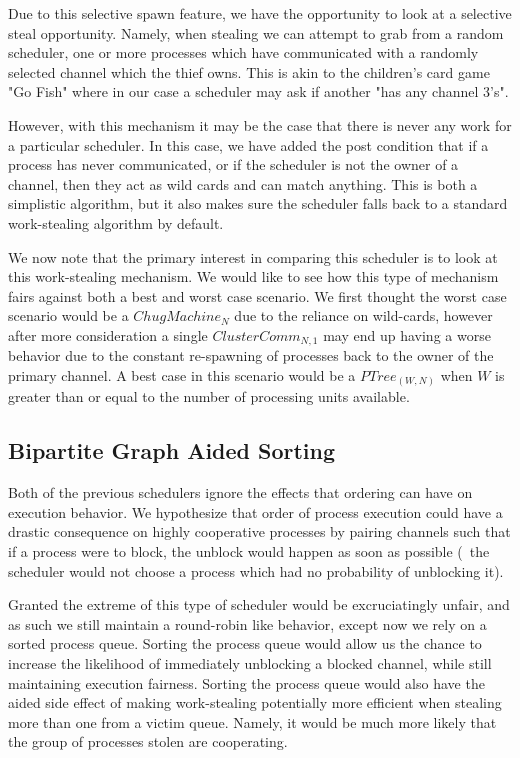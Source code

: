 Due to this selective spawn feature, we have the opportunity to look at a 
selective steal opportunity. Namely, when stealing we can attempt to grab from
a random scheduler, one or more processes which have communicated with a 
randomly selected channel which the thief owns. This is akin to the children's
card game "Go Fish" where in our case a scheduler may ask if another "has any
channel 3's".

However, with this mechanism it may be the case that there is never any work
for a particular scheduler. In this case, we have added the post condition that
if a process has never communicated, or if the scheduler is not the owner of a
channel, then they act as wild cards and can match anything. This is both a 
simplistic algorithm, but it also makes sure the scheduler falls back to a 
standard work-stealing algorithm by default.

We now note that the primary interest in comparing this scheduler is to look at 
this work-stealing mechanism.
We would like to see how this type of mechanism fairs against both a best and
worst case scenario. We first thought the worst case scenario would be a 
$ChugMachine_N$ due to the reliance on wild-cards, however after more 
consideration a single $ClusterComm_{N,1}$ may end up having a worse behavior
due to the constant re-spawning of processes back to the owner of the primary
channel. A best case in this scenario would be a $PTree_{(W,N)}$ when $W$ is greater than or equal
to the number of processing units available.

\subsection{Bipartite Graph Aided Sorting}
    \label{sec:bipartite graph aided sorting}

Both of the previous schedulers ignore the effects that ordering can have on
execution behavior. We hypothesize that order of process execution could have
a drastic consequence on highly cooperative processes by pairing channels such
that if a process were to block, the unblock would happen as soon as possible
(\ie~the scheduler would not choose a process which had no probability of
unblocking it).

Granted the extreme of this type of scheduler would be excruciatingly unfair, and
as such we still maintain a round-robin like behavior, except now we rely on 
a sorted process queue. Sorting the process queue would allow us the chance to 
increase the likelihood of immediately unblocking a blocked channel, while still
maintaining execution fairness. 
Sorting the process queue would also have the aided side effect of making 
work-stealing potentially more efficient when stealing more than one from a 
victim queue. Namely, it would be much more likely that the group of processes
stolen are cooperating. 

